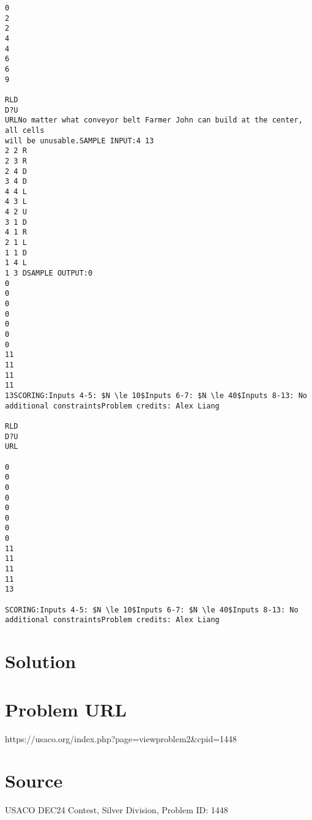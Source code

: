 \documentclass[12pt]{article}
\begin{document}
\begin{verbatim}
0
2
2
4
4
6
6
9

RLD
D?U
URLNo matter what conveyor belt Farmer John can build at the center, all cells 
will be unusable.SAMPLE INPUT:4 13
2 2 R
2 3 R
2 4 D
3 4 D
4 4 L
4 3 L
4 2 U
3 1 D
4 1 R
2 1 L
1 1 D
1 4 L
1 3 DSAMPLE OUTPUT:0
0
0
0
0
0
0
0
11
11
11
11
13SCORING:Inputs 4-5: $N \le 10$Inputs 6-7: $N \le 40$Inputs 8-13: No additional constraintsProblem credits: Alex Liang

RLD
D?U
URL

0
0
0
0
0
0
0
0
11
11
11
11
13

SCORING:Inputs 4-5: $N \le 10$Inputs 6-7: $N \le 40$Inputs 8-13: No additional constraintsProblem credits: Alex Liang
\end{verbatim}

\section*{Solution}


\section*{Problem URL}
https://usaco.org/index.php?page=viewproblem2&cpid=1448

\section*{Source}
USACO DEC24 Contest, Silver Division, Problem ID: 1448
\end{document}
